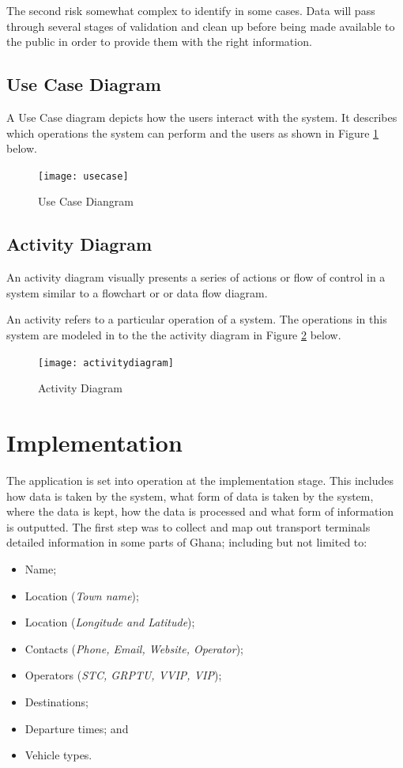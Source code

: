 The second risk somewhat complex to identify in some cases. Data will pass through several stages of validation and clean up before being made available to the public in order to provide them with the right information.

\subsection{Use Case Diagram}
A Use Case diagram depicts how the users interact with the system. It describes which operations the system can perform and the users as shown in Figure \ref{fig:usecase} below.

\begin{figure}[H]
	\centering
	\texttt{[image: usecase]}
	\caption[Use Case Diangram]{Use Case Diangram}
	\label{fig:usecase}
\end{figure}


\subsection{Activity Diagram}
An activity diagram visually presents a series of actions or flow of control in a system similar to a flowchart or or data flow diagram.

An activity refers to a particular operation of a system. The operations in this system are modeled in to the the activity diagram in Figure \ref{fig:activitydiagram} below.
\begin{figure}[H]
	\centering
	\texttt{[image: activitydiagram]}
	\caption[Activity Diagram]{Activity Diagram}
	\label{fig:activitydiagram}
\end{figure}

\section{Implementation}
The application is set into operation at the implementation stage. This includes how data is taken by the system, what form of data is taken by the system, where the data is kept, how the data is processed and what form of information is outputted. The first step was to collect and map out transport terminals detailed information in some parts of Ghana; including but not limited to:
\begin{itemize}
	\item Name;
	\item Location (\textit{Town name});
	\item Location (\textit{Longitude and Latitude});
	\item Contacts (\textit{Phone, Email, Website, Operator});
	\item Operators (\textit{STC, GRPTU, VVIP, VIP});
	\item Destinations;
	\item Departure times; and
	\item Vehicle types.
\end{itemize}

